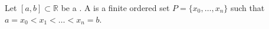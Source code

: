\begin{definition} \label{definition:partition_of_a_closed_interval_in_the_real_line}
    Let $[a,b] \subset \mathbb{R}$ be a . 
    A  is a finite ordered set $P = \{x_0,\dots,x_n\}$ such that $a = x_0 < x_1 < \dots < x_n = b$.
\end{definition}